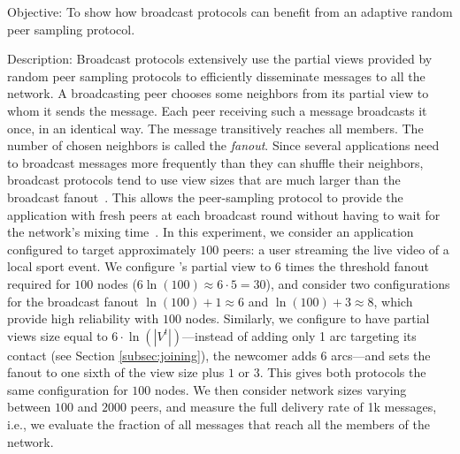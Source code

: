 \begin{asparadesc}
\item [Objective:] To show how broadcast protocols can benefit from
  an adaptive random peer sampling protocol.
\item [Description:] Broadcast protocols extensively use the partial
  views provided by random peer sampling protocols to efficiently
  disseminate messages to all the network. A broadcasting peer chooses
  some neighbors from its partial view to whom it sends the
  message. Each peer receiving such a message broadcasts it once, in
  an identical way. The message transitively reaches all members. The
  number of chosen neighbors is called the \emph{fanout}. Since
  several applications need to broadcast messages more frequently than
  they can shuffle their neighbors, broadcast protocols tend to use
  view sizes that are much larger than the broadcast
  fanout~\cite{Frey09Middleware}. This allows the peer-sampling
  protocol to provide the application with fresh peers at each
  broadcast round without having to wait for the network's mixing
  time~\cite{jelasity2007gossip}. In this experiment, we consider an
  application configured to target approximately $100$ peers: a user
  streaming the live video of a local sport event. We configure
  \CYCLON's partial view to $6$ times the threshold fanout required
  for $100$ nodes ($6 \ln(100) \approx 6 \cdot 5 = 30$), and consider
  two configurations for the broadcast fanout $\ln(100)+1 \approx 6 $
  and $\ln(100)+3 \approx 8$, which provide high reliability with
  $100$ nodes. Similarly, we configure \SPRAY to have partial views
  size equal to $6 \cdot \ln(|V^t|)$---instead of adding only 1 arc
  targeting its contact (see Section \ref{subsec:joining}), the
  newcomer adds 6 arcs---and sets the fanout to one sixth of the view
  size plus $1$ or $3$. This gives both protocols the same
  configuration for $100$ nodes.  We then consider network sizes
  varying between $100$ and $2000$ peers, and measure the full
  delivery rate of 1k messages, i.e., we evaluate the fraction of
  all messages that reach all the members of the network.


\end{asparadesc}
